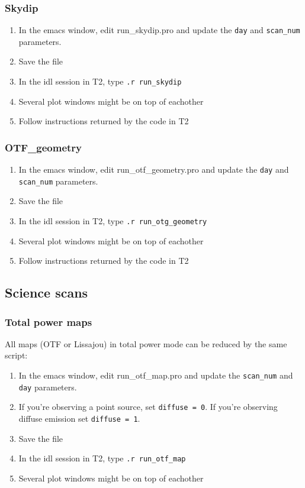 \documentclass[a4paper,10pt]{article}
\begin{document}
\subsubsection{Skydip}

\begin{enumerate}
\item In the emacs window, edit run\_skydip.pro and update the {\tt day}
  and {\tt scan\_num} parameters.
\item Save the file
\item In the idl session in T2, type {\tt .r run\_skydip}
\item Several plot windows might be on top of eachother
\item Follow instructions returned by the code in T2
\end{enumerate}


\subsubsection{OTF\_geometry}

\begin{enumerate}
\item In the emacs window, edit run\_otf\_geometry.pro and update the {\tt day}
  and {\tt scan\_num} parameters.
\item Save the file
\item In the idl session in T2, type {\tt .r run\_otg\_geometry}
\item Several plot windows might be on top of eachother
\item Follow instructions returned by the code in T2
\end{enumerate}

\subsection{Science scans}

\subsubsection{Total power maps}

All maps (OTF or Lissajou) in total power mode can be reduced by the same script:

\begin{enumerate}
\item In the emacs window, edit run\_otf\_map.pro and update the {\tt scan\_num}
  and {\tt day} parameters.
\item If you're observing a point source, set {\tt diffuse = 0}. If you're
  observing diffuse emission set {\tt diffuse = 1}.
\item Save the file
\item In the idl session in T2, type {\tt .r run\_otf\_map}
\item Several plot windows might be on top of eachother
\end{enumerate}
\end{document}
